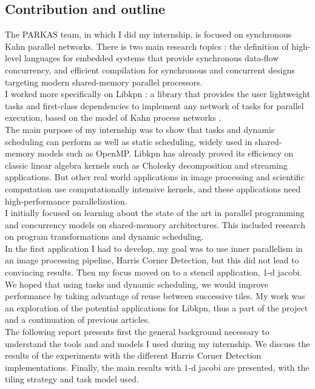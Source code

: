 \documentclass[a4paper,11pt]{article}
\begin{document}
\subsection{Contribution and outline}
The PARKAS team, in which I did my internship, is focused on synchronous Kahn parallel networks. There 
is two main research topics : the definition of high-level languages for embedded systems that provide
synchronous data-flow concurrency, and efficient compilation for synchronous and concurrent designs 
targeting modern shared-memory parallel processors. \\
I worked more specifically on Libkpn : a library that provides the user lightweight tasks and
first-class dependencies to implement any network of tasks for parallel execution, based
on the model of Kahn process networks \cite{kahn_semantics_1974}.\\
The main purpose of my internship was to show that tasks and dynamic scheduling can
perform as well as static scheduling,  widely used in shared-memory models such
as OpenMP. Libkpn has already proved its efficiency on classic linear algebra kernels such
as Cholesky decomposition and streaming applications. But other real world applications
in image processing and scientific computation use computationally intensive kernels, and these
applications need high-performance parallelization.\\
I initially focused on learning about the state of the art in parallel programming and concurrency
models on shared-memory architectures. This included research on program transformations and dynamic
scheduling. \\
In the first application I had to develop, my goal was to use inner parallelism in an image processing
pipeline, Harris Corner Detection, but this did not lead to convincing results. Then my focus moved 
on to a stencil application, 1-d jacobi. We hoped that using tasks and dynamic scheduling, we would 
improve performance by taking advantage of reuse between successive tiles. My work was an exploration
of the potential applications for Libkpn, thus a part of the project and a continuation of previous 
articles.\\
\vspace{1cm}
The following report presents first the general background necessary to understand the tools and and models
I used during my internship. We discuss the results of the experiments with the different Harris Corner
Detection implementations. Finally, the main results with 1-d jacobi are presented, with the tiling 
strategy and task model used.
\end{document}
